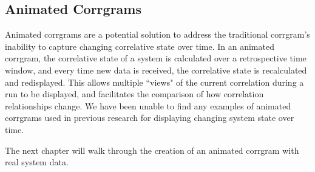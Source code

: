 \subsection{Animated Corrgrams}

Animated corrgrams are a potential solution to address the traditional corrgram's inability to capture changing correlative state over time. In an animated corrgram, the correlative state of a system is calculated over a retrospective time window, and every time new data is received, the correlative state is recalculated and redisplayed. This allows multiple ``views" of the current correlation during a run to be displayed, and facilitates the comparison of how correlation relationships change. We have been unable to find any examples of animated corrgrams used in previous research for displaying changing system state over time.

The next chapter will walk through the creation of an animated corrgram with real system data.










